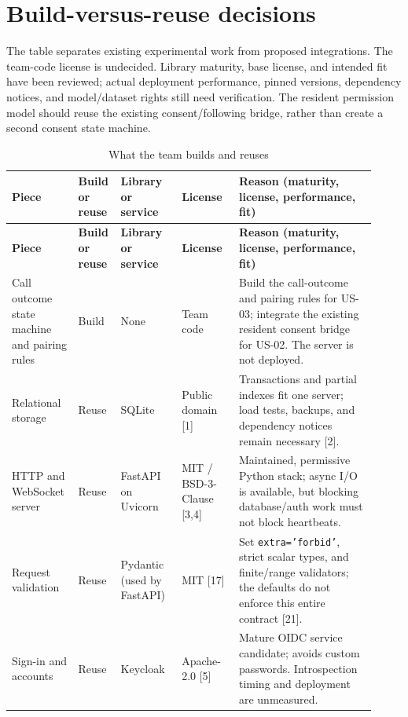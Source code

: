 \documentclass[12pt,letterpaper]{article}
\newcommand{\field}[1]{\texttt{#1}}
\begin{document}
\section{Build-versus-reuse decisions}

The table separates existing experimental work from proposed integrations. The team-code license is undecided. Library maturity, base license, and intended fit have been reviewed; actual deployment performance, pinned versions, dependency notices, and model/dataset rights still need verification. The resident permission model should reuse the existing consent/following bridge, rather than create a second consent state machine.

\begingroup\small
\setlength{\tabcolsep}{4pt}
\begin{longtable}{@{}>{\RaggedRight\arraybackslash}p{0.17\linewidth}>{\RaggedRight\arraybackslash}p{0.08\linewidth}>{\RaggedRight\arraybackslash}p{0.16\linewidth}>{\RaggedRight\arraybackslash}p{0.15\linewidth}>{\RaggedRight\arraybackslash}p{0.36\linewidth}@{}}
\caption{What the team builds and reuses}\\
\toprule\textbf{Piece} & \textbf{Build or reuse} & \textbf{Library or service} & \textbf{License} & \textbf{Reason (maturity, license, performance, fit)}\\\midrule\endfirsthead
\toprule\textbf{Piece} & \textbf{Build or reuse} & \textbf{Library or service} & \textbf{License} & \textbf{Reason (maturity, license, performance, fit)}\\\midrule\endhead
\midrule\endfoot\bottomrule\endlastfoot
Call outcome state machine and pairing rules & Build & None & Team code & Build the call-outcome and pairing rules for US-03; integrate the existing resident consent bridge for US-02. The server is not deployed. \\
Relational storage & Reuse & SQLite & Public domain [1] & Transactions and partial indexes fit one server; load tests, backups, and dependency notices remain necessary [2]. \\
HTTP and WebSocket server & Reuse & FastAPI on Uvicorn & MIT / BSD-3-Clause [3,4] & Maintained, permissive Python stack; async I/O is available, but blocking database/auth work must not block heartbeats. \\
Request validation & Reuse & Pydantic (used by FastAPI) & MIT [17] & Set \field{extra='forbid'}, strict scalar types, and finite/range validators; the defaults do not enforce this entire contract [21]. \\
Sign-in and accounts & Reuse & Keycloak & Apache-2.0 [5] & Mature OIDC service candidate; avoids custom passwords. Introspection timing and deployment are unmeasured. \\

\end{longtable}
\end{document}
